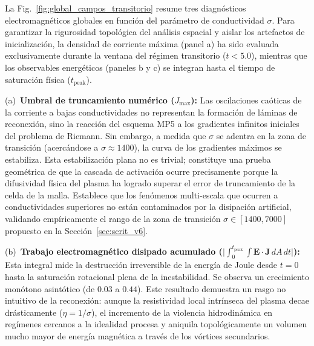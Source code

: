 \primerparrafo La Fig.~\ref{fig:global_campos_transitorio} resume tres diagnósticos electromagnéticos globales en función del parámetro de conductividad $\sigma$. Para garantizar la rigurosidad topológica del análisis espacial y aislar los artefactos de inicialización, la densidad de corriente máxima (panel a) ha sido evaluada exclusivamente durante la ventana del régimen transitorio ($t < 5.0$), mientras que los observables energéticos (paneles b y c) se integran hasta el tiempo de saturación física ($t_{\mathrm{peak}}$).

(a)~\textbf{Umbral de truncamiento numérico ($J_{\max}$):} Las oscilaciones caóticas de la corriente a bajas conductividades no representan la formación de láminas de reconexión, sino la reacción del esquema MP5 a los gradientes infinitos iniciales del problema de Riemann. Sin embargo, a medida que $\sigma$ se adentra en la zona de transición (acercándose a $\sigma \approx 1400$), la curva de los gradientes máximos se estabiliza. Esta estabilización plana no es trivial; constituye una prueba geométrica de que la cascada de activación ocurre precisamente porque la difusividad física del plasma ha logrado superar el error de truncamiento de la celda de la malla. Establece que los fenómenos multi-escala que ocurren a conductividades superiores no están contaminados por la disipación artificial, validando empíricamente el rango de la zona de transición $\sigma \in [1400, 7000]$ propuesto en la Sección~\ref{sec:scrit_v6}.

(b)~\textbf{Trabajo electromagnético disipado acumulado ($\big|\int_0^{t_{\mathrm{peak}}}\!\!\int\mathbf{E}\!\cdot\!\mathbf{J}\,dA\,dt\big|$):} Esta integral mide la destrucción irreversible de la energía de Joule desde $t=0$ hasta la saturación rotacional plena de la inestabilidad. Se observa un crecimiento monótono asintótico (de $0.03$ a $0.44$). Este resultado demuestra un rasgo no intuitivo de la reconexión: aunque la resistividad local intrínseca del plasma decae drásticamente ($\eta = 1/\sigma$), el incremento de la violencia hidrodinámica en regímenes cercanos a la idealidad procesa y aniquila topológicamente un volumen mucho mayor de energía magnética a través de los vórtices secundarios. 

